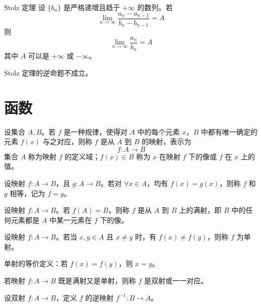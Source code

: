 \begin{theorem}{Stolz 定理}
    设 $\{b_n\}$ 是严格递增且趋于 $+\infty$ 的数列。若
    \[\lim_{n \to \infty}\frac{a_{n} - a_{n - 1}}{b_{n} - b_{n - 1}} = A\]
    则
    \[\lim_{n \to \infty}\frac{a_n}{b_n} = A\]
    其中 $A$ 可以是 $+\infty$ 或 $-\infty$。
\end{theorem}

\begin{remark}
    Stolz 定理的逆命题不成立。
\end{remark}


\section{函数}

\begin{definition}
    设集合 $A, B$。若 $f$ 是一种规律，使得对 $A$ 中的每个元素 $x$，$B$ 中都有唯一确定的元素 $f(x)$ 与之对应，则称 $f$ 是从 $A$ 到 $B$ 的映射，表示为
    \[f : A \to B\]
    集合 $A$ 称为映射 $f$ 的定义域；$f(x) \in B$ 称为 $x$ 在映射 $f$ 下的像或 $f$ 在 $x$ 上的值。
\end{definition}

\begin{definition}
    设映射 $f : A \to B$，且 $g : A \to B$。若对 $\forall x \in A$，均有 $f(x) = g(x)$，则称 $f$ 和 $g$ 相等，记为 $f = g$。
\end{definition}

\begin{definition}
    设映射 $f : A \to B$。若 $f(A) = B$，则称 $f$ 是从 $A$ 到 $B$ 上的满射，即 $B$ 中的任何元素都是 $A$ 中某一元素在 $f$ 下的像。
\end{definition}

\begin{definition}
    设映射 $f : A \to B$。若当 $x, y \in A$ 且 $x \ne y$ 时，有 $f(x) \ne f(y)$，则称 $f$ 为单射。
\end{definition}

\begin{remark}
    单射的等价定义：若 $f(x) = f(y)$，则 $x = y$。
\end{remark}

\begin{definition}
    若映射 $f : A \to B$ 既是满射又是单射，则称 $f$ 是双射或一一对应。
\end{definition}

\begin{definition}
    设双射 $f : A \to B$，定义 $f$ 的逆映射 $f^{-1} : B \to A$。
\end{definition}

